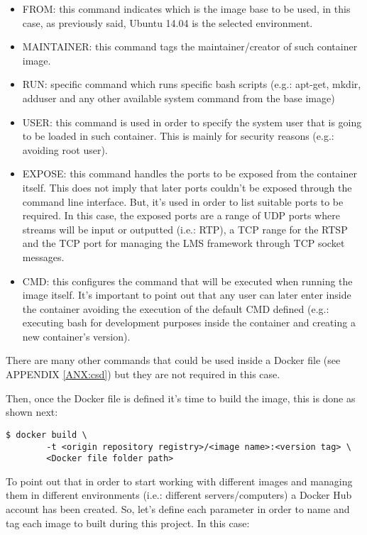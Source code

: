 \begin{itemize}
\item FROM: this command indicates which is the image base to be used, in this case, as previously said, Ubuntu 14.04 is the selected environment.
\item MAINTAINER: this command tags the maintainer/creator of such container image.
\item RUN: specific command which runs specific bash scripts (e.g.: apt-get, mkdir, adduser and any other available system command from the base image)
\item USER: this command is used in order to specify the system user that is going to be loaded in such container. This is mainly for security reasons (e.g.: avoiding root user).
\item EXPOSE: this command handles the ports to be exposed from the container itself. This does not imply that later ports couldn't be exposed through the command line interface. But, it's used in order to list suitable ports to be required. In this case, the exposed ports are a range of UDP ports where streams will be input or outputted (i.e.: RTP), a TCP range for the RTSP and the TCP port for managing the LMS framework through TCP socket messages. 
\item CMD: this configures the command that will be executed when running the image itself. It's important to point out that any user can later enter inside the container avoiding the execution of the default CMD defined (e.g.: executing bash for development purposes inside the container and creating a new container's version).
\end{itemize}

There are many other commands that could be used inside a Docker file (see APPENDIX \ref{ANX:csd}) but they are not required in this case.

Then, once the Docker file is defined it's time to build the image, this is done as shown next:

\begin{verbatim}
$ docker build \
		-t <origin repository registry>/<image name>:<version tag> \
		<Docker file folder path>
\end{verbatim}

To point out that in order to start working with different images and managing them in different environments (i.e.: different servers/computers) a Docker Hub account has been created. So, let's define each parameter in order to name and tag each image to built during this project. In this case:

